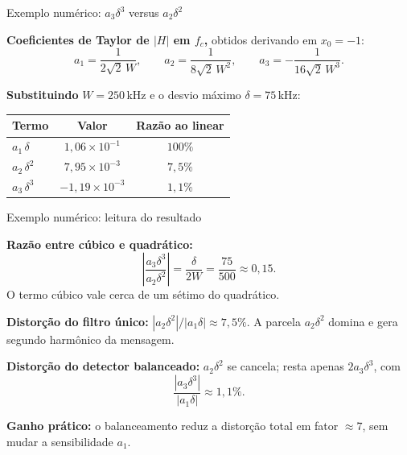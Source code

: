 
\begin{frame}{Exemplo numérico: $a_3 \delta^3$ versus $a_2 \delta^2$}

\small
\textbf{Coeficientes de Taylor de $|H|$ em $f_c$,} obtidos derivando em $x_0 = -1$:
\[
a_1 = \frac{1}{2\sqrt{2}\,W}, \qquad
a_2 = \frac{1}{8\sqrt{2}\,W^2}, \qquad
a_3 = -\frac{1}{16\sqrt{2}\,W^3}.
\]

\pause
\textbf{Substituindo} $W = 250$\,kHz e o desvio máximo $\delta = 75$\,kHz:
\begin{center}
\renewcommand{\arraystretch}{1.15}
\begin{tabular}{|l|c|c|}
\hline
Termo & Valor & Razão ao linear \\
\hline
$a_1\,\delta$        & $1{,}06 \times 10^{-1}$  & $100\%$ \\
$a_2\,\delta^2$      & $7{,}95 \times 10^{-3}$  & $7{,}5\%$ \\
$a_3\,\delta^3$      & $-1{,}19 \times 10^{-3}$ & $1{,}1\%$ \\
\hline
\end{tabular}
\end{center}

\end{frame}


\begin{frame}{Exemplo numérico: leitura do resultado}

\footnotesize
\textbf{Razão entre cúbico e quadrático:}
\[
\left|\frac{a_3 \delta^3}{a_2 \delta^2}\right| = \frac{\delta}{2W} = \frac{75}{500} \approx 0{,}15.
\]
O termo cúbico vale cerca de um sétimo do quadrático.

\pause
\textbf{Distorção do filtro único:} $|a_2 \delta^2|/|a_1 \delta| \approx 7{,}5\%$. A parcela $a_2 \delta^2$ domina e gera segundo harmônico da mensagem.

\pause
\textbf{Distorção do detector balanceado:} $a_2 \delta^2$ se cancela; resta apenas $2 a_3 \delta^3$, com
\[
\frac{|a_3 \delta^3|}{|a_1 \delta|} \approx 1{,}1\%.
\]

\pause
\textbf{Ganho prático:} o balanceamento reduz a distorção total em fator $\approx 7$, sem mudar a sensibilidade $a_1$.

\end{frame}


